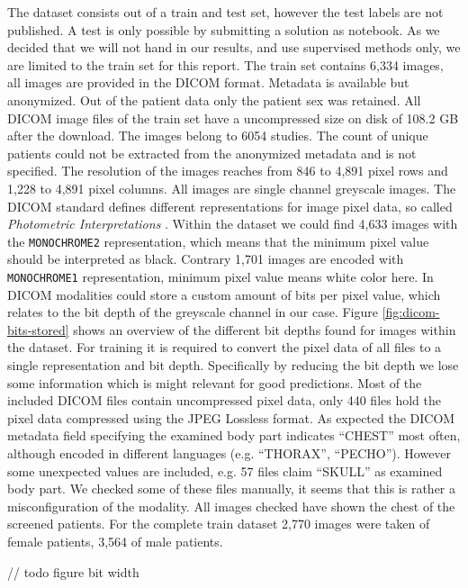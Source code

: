 The dataset consists out of a train and test set, however the test labels are not published. A test is only possible by submitting a solution as notebook. As we decided that we will not hand in our results, and use supervised methods only, we are limited to the train set for this report. The train set contains 6,334 images, all images are provided in the DICOM format. Metadata is available but anonymized. Out of the patient data only the patient sex was retained. All DICOM image files of the train set have a uncompressed size on disk of 108.2 GB after the download. The images belong to 6054 studies. The count of unique patients could not be extracted from the anonymized metadata and is not specified. The resolution of the images reaches from 846 to 4,891 pixel rows and 1,228 to 4,891 pixel columns. All images are single channel greyscale images. The DICOM standard defines different representations for image pixel data, so called \textit{Photometric Interpretations} \autocite{dicom2018}. Within the dataset we could find 4,633 images with the \texttt{MONOCHROME2} representation, which means that the minimum pixel value should be interpreted as black. Contrary 1,701 images are encoded with \texttt{MONOCHROME1} representation, minimum pixel value means white color here. In DICOM modalities could store a custom amount of bits per pixel value, which relates to the bit depth of the greyscale channel in our case. Figure \ref{fig:dicom-bits-stored} shows an overview of the different bit depths found for images within the dataset. For training it is required to convert the pixel data of all files to a single representation and bit depth. Specifically by reducing the bit depth we lose some information which is might relevant for good predictions. Most of the included DICOM files contain uncompressed pixel data, only 440 files hold the pixel data compressed using the JPEG Lossless format. As expected the DICOM metadata field specifying the examined body part indicates \enquote{CHEST} most often, although encoded in different languages (e.g. \enquote{THORAX}, \enquote{PECHO}). However some unexpected values are included, e.g. 57 files claim \enquote{SKULL} as examined body part. We checked some of these files manually, it seems that this is rather a misconfiguration of the modality. All images checked have shown the chest of the screened patients. For the complete train dataset 2,770 images were taken of female patients, 3,564 of male patients.

// todo figure bit width

